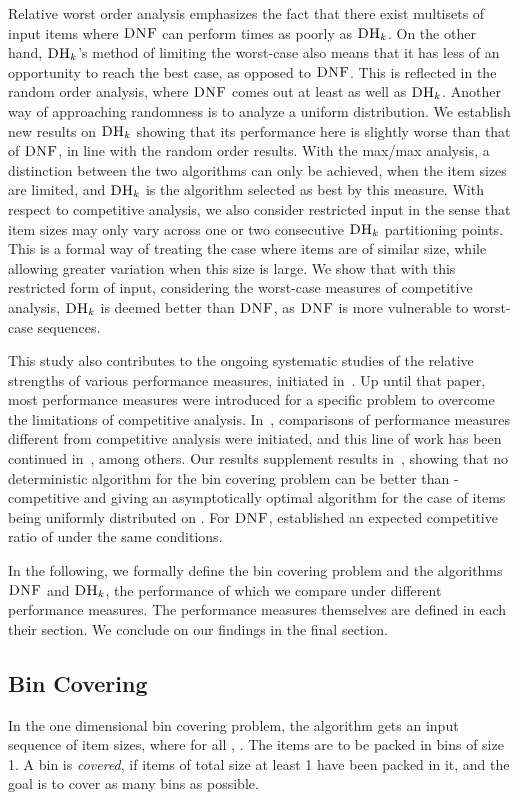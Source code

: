 \documentclass[11pt]{article}
\newcommand{\DNF}{\ensuremath{\operatorname{\textsc{DNF}}}\xspace}
\newcommand{\DHk}{{\ensuremath{\textsc{DH}_k}}\xspace}
\begin{document}
Relative worst order analysis emphasizes the fact that there
exist multisets of input items where \DNF can perform
 times as poorly as \DHk. On the other hand,
\DHk's method of limiting the worst-case also means that it has less
of an opportunity to reach the best case, as opposed to \DNF.
This is reflected in the random order analysis, where \DNF
comes out at least as well as \DHk.
Another way of approaching randomness is to analyze a uniform distribution.
We establish new results on \DHk showing that its performance here
is slightly worse than that of \DNF, in line with the random order results.
With the max/max analysis, a distinction between the two algorithms 
can only be achieved, when the item sizes are limited, and
\DHk is the algorithm selected as best by this measure.
With respect to competitive analysis,
we also consider restricted input in the sense that item sizes may
only vary across one or two consecutive \DHk partitioning points. This is a
formal way of treating the case where items are of similar size,
while allowing greater variation when this size is large. We show
that with this restricted form of input, considering the
worst-case measures of competitive analysis, \DHk is deemed
better than \DNF, as \DNF is more vulnerable to
worst-case sequences. 

This study also contributes to the ongoing systematic studies of
the relative strengths of various performance measures,
initiated in~\cite{BIL09p}. Up until that paper, most performance
measures were introduced for a specific problem to 
overcome the limitations of
competitive analysis. In~\cite{BIL09p}, comparisons
of performance measures different from competitive analysis
were initiated, and this line of work has been continued
in~\cite{BGL12p,BLM12p,BGL13}, among others.
Our results supplement results in~\cite{C88},
showing that
no deterministic algorithm for the bin covering problem
can be better than -competitive and
giving an asymptotically optimal algorithm for the case of items
being uniformly distributed on .
For \DNF, \cite{CFGK91} established an expected competitive
ratio of  under the same conditions.

In the following, we formally define the bin covering problem and the
algorithms \DNF and \DHk, the performance of which we compare under
different performance measures. The performance measures themselves are
defined in each their section.
We conclude on our findings in the final section.

\subsection*{Bin Covering}
In the one dimensional bin covering problem, the algorithm gets an input
sequence  of item sizes, where for all , .
The items are to be packed in bins of size 1.
A bin is {\em covered}, if items of total size at least 1 have been
 packed in it, and
the goal is to cover as many bins as possible.
\end{document}
